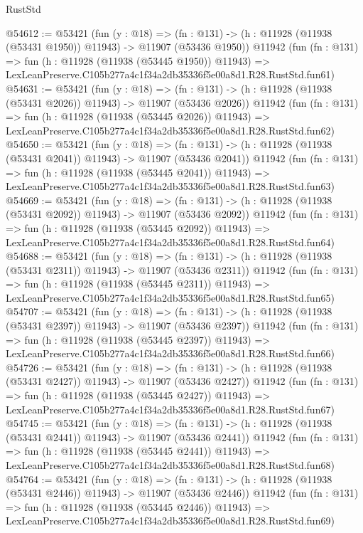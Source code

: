 \begin{lexlean}{RustStd}
\begin{coremodule}
@54612 := @53421
    (fun (y : @18) =>
    (fn : @131) -> (h : @11928 (@11938 (@53431 @1950)) @11943) -> @11907 (@53436 @1950))
    @11942
    (fun (fn : @131) =>
    fun (h : @11928 (@11938 (@53445 @1950)) @11943) =>
    LexLeanPreserve.C105b277a4c1f34a2db35336f5e00a8d1.R28.RustStd.fun61)
@54631 := @53421
    (fun (y : @18) =>
    (fn : @131) -> (h : @11928 (@11938 (@53431 @2026)) @11943) -> @11907 (@53436 @2026))
    @11942
    (fun (fn : @131) =>
    fun (h : @11928 (@11938 (@53445 @2026)) @11943) =>
    LexLeanPreserve.C105b277a4c1f34a2db35336f5e00a8d1.R28.RustStd.fun62)
@54650 := @53421
    (fun (y : @18) =>
    (fn : @131) -> (h : @11928 (@11938 (@53431 @2041)) @11943) -> @11907 (@53436 @2041))
    @11942
    (fun (fn : @131) =>
    fun (h : @11928 (@11938 (@53445 @2041)) @11943) =>
    LexLeanPreserve.C105b277a4c1f34a2db35336f5e00a8d1.R28.RustStd.fun63)
@54669 := @53421
    (fun (y : @18) =>
    (fn : @131) -> (h : @11928 (@11938 (@53431 @2092)) @11943) -> @11907 (@53436 @2092))
    @11942
    (fun (fn : @131) =>
    fun (h : @11928 (@11938 (@53445 @2092)) @11943) =>
    LexLeanPreserve.C105b277a4c1f34a2db35336f5e00a8d1.R28.RustStd.fun64)
@54688 := @53421
    (fun (y : @18) =>
    (fn : @131) -> (h : @11928 (@11938 (@53431 @2311)) @11943) -> @11907 (@53436 @2311))
    @11942
    (fun (fn : @131) =>
    fun (h : @11928 (@11938 (@53445 @2311)) @11943) =>
    LexLeanPreserve.C105b277a4c1f34a2db35336f5e00a8d1.R28.RustStd.fun65)
@54707 := @53421
    (fun (y : @18) =>
    (fn : @131) -> (h : @11928 (@11938 (@53431 @2397)) @11943) -> @11907 (@53436 @2397))
    @11942
    (fun (fn : @131) =>
    fun (h : @11928 (@11938 (@53445 @2397)) @11943) =>
    LexLeanPreserve.C105b277a4c1f34a2db35336f5e00a8d1.R28.RustStd.fun66)
@54726 := @53421
    (fun (y : @18) =>
    (fn : @131) -> (h : @11928 (@11938 (@53431 @2427)) @11943) -> @11907 (@53436 @2427))
    @11942
    (fun (fn : @131) =>
    fun (h : @11928 (@11938 (@53445 @2427)) @11943) =>
    LexLeanPreserve.C105b277a4c1f34a2db35336f5e00a8d1.R28.RustStd.fun67)
@54745 := @53421
    (fun (y : @18) =>
    (fn : @131) -> (h : @11928 (@11938 (@53431 @2441)) @11943) -> @11907 (@53436 @2441))
    @11942
    (fun (fn : @131) =>
    fun (h : @11928 (@11938 (@53445 @2441)) @11943) =>
    LexLeanPreserve.C105b277a4c1f34a2db35336f5e00a8d1.R28.RustStd.fun68)
@54764 := @53421
    (fun (y : @18) =>
    (fn : @131) -> (h : @11928 (@11938 (@53431 @2446)) @11943) -> @11907 (@53436 @2446))
    @11942
    (fun (fn : @131) =>
    fun (h : @11928 (@11938 (@53445 @2446)) @11943) =>
    LexLeanPreserve.C105b277a4c1f34a2db35336f5e00a8d1.R28.RustStd.fun69)

\end{coremodule}
\end{lexlean}
